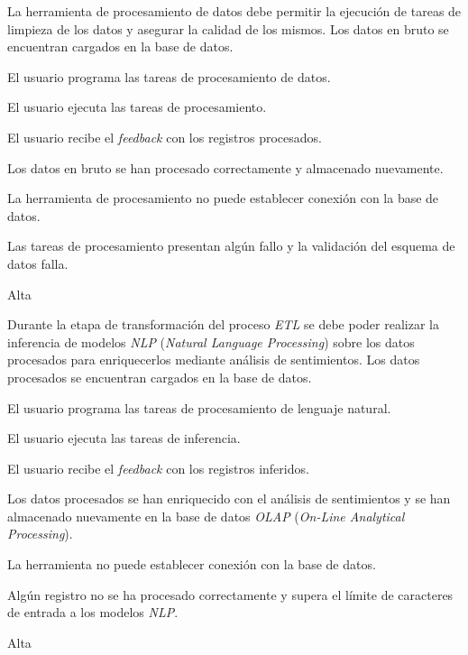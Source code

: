 {La herramienta de procesamiento de datos debe permitir la ejecución de tareas de limpieza de los datos y asegurar la calidad de los mismos.}
{Los datos en bruto se encuentran cargados en la base de datos.}
{
\item El usuario programa las tareas de procesamiento de datos.
\item El usuario ejecuta las tareas de procesamiento.
\item El usuario recibe el \textit{feedback} con los registros procesados.
}
{Los datos en bruto se han procesado correctamente y almacenado nuevamente.}
{
\item La herramienta de procesamiento no puede establecer conexión con la base de datos.
\item Las tareas de procesamiento presentan algún fallo y la validación del esquema de datos falla.
}
{Alta}


{Durante la etapa de transformación del proceso \textit{ETL} se debe poder realizar la inferencia de modelos \textit{NLP} (\textit{Natural Language Processing}) sobre los datos procesados para enriquecerlos mediante análisis de sentimientos.}
{Los datos procesados se encuentran cargados en la base de datos.}
{
\item El usuario programa las tareas de procesamiento de lenguaje natural.
\item El usuario ejecuta las tareas de inferencia.
\item El usuario recibe el \textit{feedback} con los registros inferidos.
}
{Los datos procesados se han enriquecido con el análisis de sentimientos y se han almacenado nuevamente en la base de datos \textit{OLAP} (\textit{On-Line Analytical Processing}).}
{
\item La herramienta no puede establecer conexión con la base de datos.
\item Algún registro no se ha procesado correctamente y supera el límite de caracteres de entrada a los modelos \textit{NLP}.
}
{Alta}

